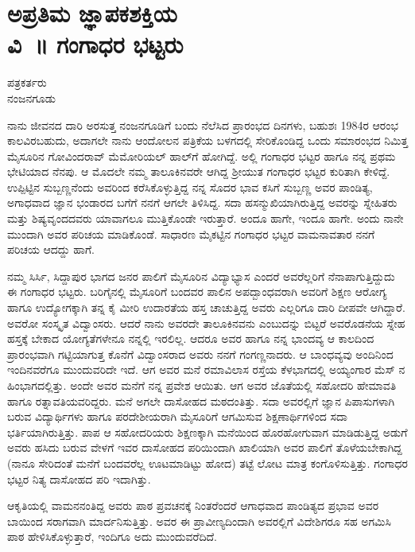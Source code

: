 {\fontsize{14}{16}\selectfont
\chapter[ಅಪ್ರತಿಮ ಜ್ಞಾಪಕಶಕ್ತಿಯ ವಿ~॥  ಗಂಗಾಧರ ಭಟ್ಟರು]{ಅಪ್ರತಿಮ ಜ್ಞಾಪಕಶಕ್ತಿಯ \\ವಿ~॥ ಗಂಗಾಧರ ಭಟ್ಟರು}
\begin{center}

ಪತ್ರಕರ್ತರು\\
ನಂಜನಗೂಡು
\addrule
\end{center}

ನಾನು ಜೀವನದ ದಾರಿ ಅರಸುತ್ತ ನಂಜನಗೂಡಿಗೆ ಬಂದು ನೆಲೆಸಿದ ಪ್ರಾರಂಭದ ದಿನಗಳು, ಬಹುಶಃ 1984ರ ಆರಂಭ ಕಾಲವಿರಬಹುದು, ಅದಾಗಲೇ ನಾನು ಆಂದೋಲನ ಪತ್ರಿಕೆಯ ಬಳಗದಲ್ಲಿ ಸೇರಿಕೊಂಡಿದ್ದ  ಒಂದು ಸಮಾರಂಭದ ನಿಮಿತ್ತ ಮೈಸೂರಿನ  ಗೋವಿಂದ\-ರಾವ್ ಮೆಮೋರಿಯಲ್ ಹಾಲ್‍ಗೆ   ಹೋಗಿದ್ದೆ. ಅಲ್ಲಿ  ಗಂಗಾಧರ ಭಟ್ಟರ ಹಾಗೂ ನನ್ನ  ಪ್ರಥಮ ಭೇಟಿಯಾದ ನೆನಪು. ಆ ಮೊದಲೇ ನಮ್ಮ ತಾಲೂಕಿನವರೇ ಆಗಿದ್ದ ಶ್ರೀಯುತ ಗಂಗಾಧರ ಭಟ್ಟರ ಕುರಿತಾಗಿ ಕೇಳಿದ್ದೆ. ಉಪ್ಪಿಟ್ಟಿನ ಸುಬ್ಬಣ್ಣನೆಂದು ಅವರಿಂದ ಕರೆಸಿಕೊಳ್ಳುತ್ತಿದ್ದ ನನ್ನ ಸೊದರ ಭಾವ ಕಸಿಗೆ ಸುಬ್ಬಣ್ಣ  ಅವರ ಪಾಂಡಿತ್ಯ, ಅಗಾಧವಾದ ಜ್ಞಾನ ಭಂಡಾರದ ಬಗೆಗೆ ನನಗೆ ಆಗಲೇ ತಿಳಿಸಿದ್ದ. ಸದಾ  ಹಸನ್ಮುಖಿಯಾಗಿರುತ್ತಿದ್ದ  ಅವರನ್ನು  ಸ್ನೇಹಿತರು ಮತ್ತು ಶಿಷ್ಯವೃಂದದವರು ಯಾವಾಗಲೂ ಮುತ್ತಿಕೊಂಡೇ ಇರುತ್ತಾರೆ. ಅಂದೂ ಹಾಗೇ,  ಇಂದೂ ಹಾಗೇ. ಅಂದು ನಾನೇ ಮುಂದಾಗಿ ಅವರ  ಪರಿಚಯ ಮಾಡಿಕೊಂಡೆ. ಸಾಧಾರಣ ಮೈಕಟ್ಟಿನ  ಗಂಗಾಧರ ಭಟ್ಟರ ವಾಮನಾವತಾರ ನನಗೆ ಪರಿಚಯ ಆದದ್ದು  ಹಾಗೆ.

ನಮ್ಮ  ಸಿರ್ಸಿ, ಸಿದ್ದಾಪುರ  ಭಾಗದ ಜನರ ಪಾಲಿಗೆ ಮೈಸೂರಿನ ವಿದ್ಯಾಭ್ಯಾಸ  ಎಂದರೆ ಅವರೆಲ್ಲರಿಗೆ ನೆನಾಪಾಗುತ್ತಿದ್ದುದು  ಈ ಗಂಗಾಧರ ಭಟ್ಟರು. ಬರಿಗೈನಲ್ಲಿ ಮೈಸೂರಿಗೆ ಬಂದವರ ಪಾಲಿನ ಅಪದ್ಬಾಂಧವರಾಗಿ  ಅವರಿಗೆ ಶಿಕ್ಷಣ ಆರೋಗ್ಯ ಹಾಗೂ ಉದ್ಯೋಗಕ್ಕಾಗಿ   ತನ್ನ ಕೈ ಮೀರಿ  ಉದಾರತೆಯ ಹಸ್ತ ಚಾಚುತ್ತಿದ್ದ  ಅವರು ಎಲ್ಲರಿಗೂ ದಾರಿ ದೀಪವೇ  ಆಗಿದ್ದಾರೆ. ಅವರೋ ಸಂಸ್ಕೃತ ವಿದ್ವಾಂಸರು. ಆದರೆ ನಾನು  ಅವರದೇ ತಾಲೂಕಿನವನು ಎಂಬುದನ್ನು ಬಿಟ್ಟರೆ  ಅವರೊಡನೆಯ  ಸ್ನೇಹ ಹಸ್ತಕ್ಕೆ  ಬೇಕಾದ ಯೋಗ್ಯತೆಗಳೇನೂ ನನ್ನಲ್ಲಿ ಇರಲಿಲ್ಲ. ಆದರೂ ಅವರ ಹಾಗೂ ನನ್ನ ಭಾಂದವ್ಯ ಆ ಕಾಲದಿಂದ ಪ್ರಾರಂಭವಾಗಿ ಗಟ್ಟಿಯಾಗುತ್ತ ಕೊನೆಗೆ ವಿದ್ವಾಂಸರಾದ ಅವರು  ನನಗೆ ಗಂಗಣ್ಣನಾದರು. ಆ ಬಾಂಧವ್ಯವು ಅಂದಿನಿಂದ ಇಂದಿನವರೆಗೂ ಮುಂದುವರಿದೇ ಇದೆ. ಆಗ ಅವರ ಮನೆ  ರಮಾವಿಲಾಸ ರಸ್ತೆಯ ಕೆಳಭಾಗದಲ್ಲಿ ಅಯ್ಯಂಗಾರ ಮೆಸ್ ನ ಹಿಂಭಾಗದಲ್ಲಿತ್ತು. ಅಂದೇ ಅವರ ಮನೆಗೆ ನನ್ನ ಪ್ರವೇಶ ಆಯಿತು. ಆಗ ಅವರ ಜೊತೆಯಲ್ಲಿ ಸಹೋದರಿ ಹೇಮಾವತಿ ಹಾಗೂ ರತ್ನಾವತಿಯವರಿದ್ದರು. ಮನೆ ಅಗಲೇ  ದಾಸೋಹದ ಮಠದಂತಿತ್ತು. ಸದಾ ಅವರಲ್ಲಿಗೆ ಜ್ಞಾನ ಪಿಪಾಸುಗಳಾಗಿ ಬರುವ ವಿದ್ಯಾರ್ಥಿಗಳು ಹಾಗೂ ಪರದೇಶೀಯರಾಗಿ ಮೈಸೂರಿಗೆ ಆಗಮಿಸುವ ಶಿಕ್ಷಣಾರ್ಥಿಗಳಿಂದ  ಸದಾ ಭರ್ತಿಯಾಗಿರುತ್ತಿತ್ತು. ಪಾಪ ಆ ಸಹೋದರಿಯರು ಶಿಕ್ಷಣಕ್ಕಾಗಿ ಮನೆಯಿಂದ ಹೊರಹೋಗುವಾಗ   ಮಾಡಿಡುತ್ತಿದ್ದ ಅಡುಗೆ ಅವರು ಹಸಿದು ಬರುವ ವೇಳಗೆ ಇವರ ದಾಸೋಹದ ಪರಿಯಿಂದಾಗಿ  ಖಾಲಿಯಾಗಿ ಅವರ ಪಾಲಿಗೆ ತೊಳೆಯಬೇಕಾಗಿದ್ದ (ನಾನೂ  ಸೇರಿದಂತೆ ಮನೆಗೆ ಬಂದವರೆಲ್ಲ ಊಟಮಾಡಿಟ್ಟು ಹೋದ) ತಟ್ಟೆ ಲೋಟ ಮಾತ್ರ ಕಂಗೊಳಿಸುತ್ತಿತ್ತು. ಗಂಗಾಧರ ಭಟ್ಟರ ನಿತ್ಯ ದಾಸೋಹದ ಪರಿ ಇದಾಗಿತ್ತು. 

ಆಕೃತಿಯಲ್ಲಿ ವಾಮನನಂತಿದ್ದ ಅವರು ಪಾಠ ಪ್ರವಚನಕ್ಕೆ ನಿಂತರೆಂದರೆ ಆಗಾಧವಾದ ಪಾಂಡಿತ್ಯದ ಪ್ರಭಾವ ಅವರ ಬಾಯಿಂದ ಸರಾಗವಾಗಿ ಮಾರ್ದನಿಸುತ್ತಿತ್ತು. ಅವರ ಈ ಪ್ರಾವೀಣ್ಯದಿಂದಾಗಿ  ಅವರಲ್ಲಿಗೆ ವಿದೇಶಿಗರೂ ಸಹ  ಅಗಮಿಸಿ ಪಾಠ ಹೇಳಿಸಿಕೊಳ್ಳುತ್ತಾರೆ, ಇಂದಿಗೂ ಅದು ಮುಂದುವರೆದಿದೆ.

}
